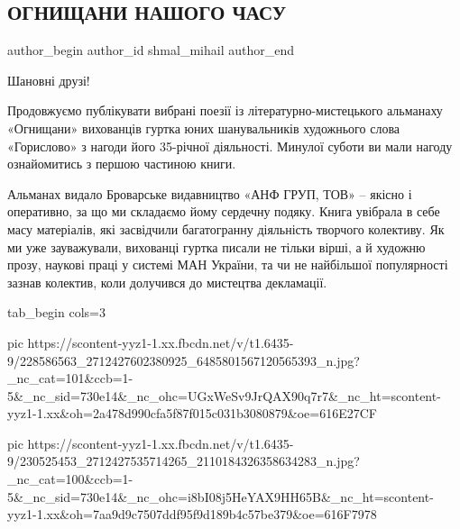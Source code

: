  
 
 
 
 
 
\subsection{ОГНИЩАНИ НАШОГО ЧАСУ}
\label{sec:03_08_2021.fb.shmal_mihail.1.ognischany_nashogo_chasu}
 
\ifcmt
 author_begin
   author_id shmal_mihail
 author_end
\fi


Шановні друзі! 

Продовжуємо публікувати вибрані поезії із літературно-мистецького
альманаху «Огнищани» вихованців гуртка юних шанувальників художнього
слова «Горислово» з нагоди його 35-річної діяльності. Минулої суботи ви
мали нагоду ознайомитись з першою частиною книги. 

Альманах видало Броварське видавництво «АНФ ГРУП, ТОВ» – якісно і
оперативно, за що ми складаємо йому сердечну подяку. Книга увібрала в
себе масу матеріалів, які засвідчили багатогранну діяльність творчого
колективу. Як ми уже зауважували, вихованці гуртка писали не тільки
вірші, а й художню прозу, наукові праці у системі МАН України, та чи не
найбільшої популярності зазнав колектив, коли долучився до мистецтва
декламації.

\ifcmt
  tab_begin cols=3

     pic https://scontent-yyz1-1.xx.fbcdn.net/v/t1.6435-9/228586563_2712427602380925_6485801567120565393_n.jpg?_nc_cat=101&ccb=1-5&_nc_sid=730e14&_nc_ohc=UGxWeSv9JrQAX90q7r7&_nc_ht=scontent-yyz1-1.xx&oh=2a478d990cfa5f87f015c031b3080879&oe=616E27CF

     pic https://scontent-yyz1-1.xx.fbcdn.net/v/t1.6435-9/230525453_2712427535714265_2110184326358634283_n.jpg?_nc_cat=100&ccb=1-5&_nc_sid=730e14&_nc_ohc=i8bI08j5HeYAX9HH65B&_nc_ht=scontent-yyz1-1.xx&oh=7aa9d9c7507ddf95f9d189b4c57be379&oe=616F7978

